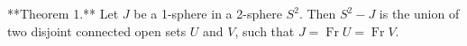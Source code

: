 **Theorem 1.** Let $J$ be a 1-sphere in a 2-sphere $S^2$. Then $S^2 - J$ is the union of two disjoint connected open sets $U$ and $V$, such that $J = \operatorname{Fr} U = \operatorname{Fr} V$.
